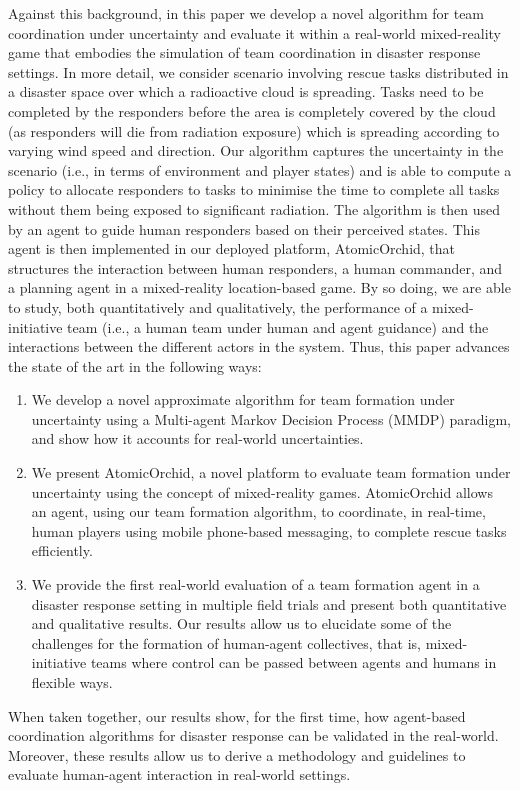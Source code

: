 Against this background, in this paper we develop a novel algorithm for team coordination under uncertainty and evaluate it within a real-world mixed-reality game that embodies the simulation of team coordination in disaster response settings. In more detail, we consider scenario involving rescue tasks distributed in a disaster space over which a radioactive cloud is spreading. Tasks need to be completed by the responders before the area is completely covered by the cloud (as responders will die from radiation exposure) which is spreading according to varying wind speed and direction. Our algorithm captures the uncertainty in the scenario (i.e., in terms of environment and player states) and  is able to compute a policy to allocate responders to tasks to minimise the time to complete all tasks without them being exposed to significant radiation. The algorithm is then used by an agent to guide human responders based on their perceived states. This agent is then implemented in our deployed platform, AtomicOrchid, that structures the interaction between human responders, a human commander, and a planning agent in a mixed-reality location-based game. By so doing, we are able to study, both quantitatively and qualitatively, the performance of a mixed-initiative team (i.e., a human team under human and agent guidance)  and the interactions between the different actors in the system. Thus, this paper advances the state of the art in the following ways:
\begin{enumerate}
\item We develop a novel approximate algorithm for team formation under uncertainty using a Multi-agent Markov Decision Process (MMDP) paradigm, and show how it accounts for real-world uncertainties.
\item We present AtomicOrchid, a novel platform to evaluate team formation under uncertainty using the concept of mixed-reality games. AtomicOrchid allows an agent, using our team formation algorithm, to coordinate, in real-time, human players using mobile phone-based messaging, to complete rescue tasks efficiently.
\item We provide the first real-world evaluation of a team formation agent in a disaster response setting in multiple field trials and present both quantitative and qualitative results. Our results allow us to elucidate some of the challenges for the formation of human-agent collectives, that is, mixed-initiative teams where control can be passed between agents and humans in flexible ways.
\end{enumerate}
When taken together, our results show, for the first time, how agent-based coordination algorithms for disaster response can be validated in the real-world. Moreover, these results allow us to derive a methodology and guidelines to evaluate human-agent interaction in real-world settings. 

